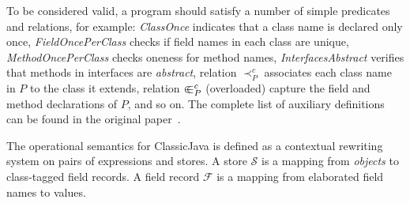 \documentclass[tese,capa,english]{texufpel}
\begin{document}
\newcommand\Inn{\in\hspace{-1ex}\in}

To be considered valid, a program should satisfy a number of simple predicates and relations, for example: \emph{ClassOnce} indicates that a class name is declared only once, \emph{FieldOncePerClass} checks if field names in each class are unique, \emph{MethodOncePerClass} checks oneness for method names, \emph{InterfacesAbstract} verifies that methods in interfaces are \emph{abstract}, relation $\prec^{c}_{P}$ associates each class name in $P$ to the class it extends, relation $\Inn^{c}_{P}$ (overloaded) capture the field and method declarations of $P$, and so on. The complete list of auxiliary definitions can be found in the original paper~\cite{Flatt:1998:CM:268946.268961}.

The operational semantics for ClassicJava is defined as a contextual rewriting system on pairs of expressions and stores. A store $\mathcal{S}$ is a mapping from \emph{objects} to class-tagged field records. A field record $\mathcal{F}$ is a mapping from elaborated field names to values.
\end{document}
